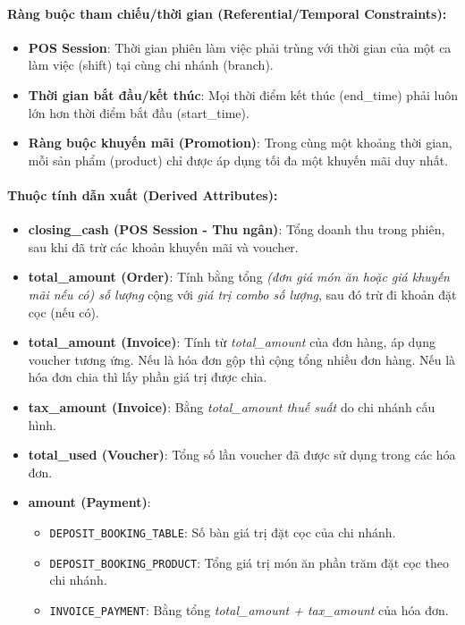 \paragraph{Ràng buộc tham chiếu/thời gian (Referential/Temporal Constraints):}
\begin{itemize}
  \item \textbf{POS Session}: Thời gian phiên làm việc phải trùng với thời gian của một ca làm việc (shift) tại cùng chi nhánh (branch).
  \item \textbf{Thời gian bắt đầu/kết thúc}: Mọi thời điểm kết thúc (end\_time) phải luôn lớn hơn thời điểm bắt đầu (start\_time).
  \item \textbf{Ràng buộc khuyến mãi (Promotion)}: Trong cùng một khoảng thời gian, mỗi sản phẩm (product) chỉ được áp dụng tối đa một khuyến mãi duy nhất.
\end{itemize}

\paragraph{Thuộc tính dẫn xuất (Derived Attributes):}
\begin{itemize}
  \item \textbf{closing\_cash (POS Session - Thu ngân)}: Tổng doanh thu trong phiên, sau khi đã trừ các khoản khuyến mãi và voucher.

  \item \textbf{total\_amount (Order)}: Tính bằng tổng \textit{(đơn giá món ăn hoặc giá khuyến mãi nếu có) \texttimes số lượng} cộng với \textit{giá trị combo \texttimes số lượng}, sau đó trừ đi khoản đặt cọc (nếu có).

  \item \textbf{total\_amount (Invoice)}: Tính từ \textit{total\_amount} của đơn hàng, áp dụng voucher tương ứng. Nếu là hóa đơn gộp thì cộng tổng nhiều đơn hàng. Nếu là hóa đơn chia thì lấy phần giá trị được chia.

  \item \textbf{tax\_amount (Invoice)}: Bằng \textit{total\_amount \texttimes thuế suất} do chi nhánh cấu hình.

  \item \textbf{total\_used (Voucher)}: Tổng số lần voucher đã được sử dụng trong các hóa đơn.

  \item \textbf{amount (Payment)}:
    \begin{itemize}
        \item \texttt{DEPOSIT\_BOOKING\_TABLE}: Số bàn \texttimes giá trị đặt cọc của chi nhánh.
        \item \texttt{DEPOSIT\_BOOKING\_PRODUCT}: Tổng giá trị món ăn \texttimes phần trăm đặt cọc theo chi nhánh.
        \item \texttt{INVOICE\_PAYMENT}: Bằng tổng \textit{total\_amount + tax\_amount} của hóa đơn.
    \end{itemize}
\end{itemize}

